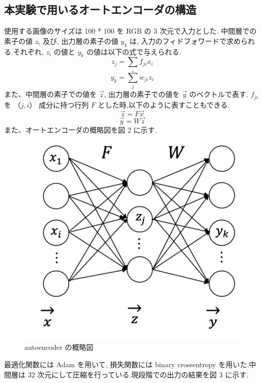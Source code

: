 \subsection{本実験で用いるオートエンコーダの構造}
使用する画像のサイズは 100 * 100 を RGB の 3 次元で入力とした.  中間層での素子の値 $z_i$ 及び, 出力層の素子の値 $y_k$ は, 入力のフィドフォワードで求められる.それぞれ, $z_i$ の値と $y_k$ の値は以下の式で与えられる.
\begin{equation}
z_j = \sum_if_{ji}x_i
\end{equation}
\begin{equation}
y_k = \sum_jw_{ji}z_i
\end{equation}
また、中間層の素子での値を $\vec{z}$, 出力層の素子での値を $\vec{y}$ のベクトルで表す.
$f_{ji}$ を $（j,i）$ 成分に持つ行列 $F$ とした時,以下のように表すこともできる.
\begin{equation}
\vec{z} = F\vec{x}
\end{equation}
\begin{equation}
\vec{y} = W\vec{z}
\end{equation}
また、オートエンコーダの概略図を図 2 に示す.
\begin{figure}[hb]
\begin{center}
\includegraphics[scale=0.25]{auto_1.png}
\caption{autoencoder の概略図}
\end{center}
\end{figure}
最適化関数には Adam を用いて, 損失関数には binary crossentropy を用いた.中間層は 32 次元にして圧縮を行っている.現段階での出力の結果を図 3 に示す.
